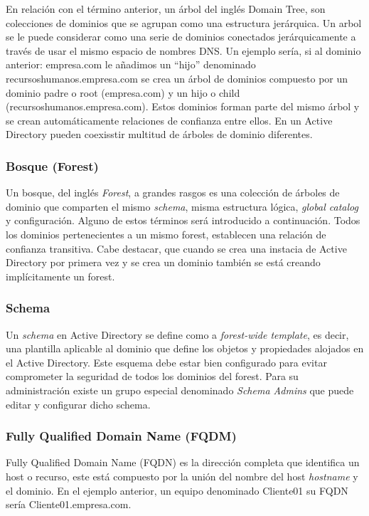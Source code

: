 En relación con el término anterior, un árbol del inglés {Domain Tree}, son colecciones de dominios que se agrupan como una estructura jerárquica. Un arbol se le puede considerar como una serie de dominios conectados jerárquicamente a través de usar el mismo espacio de nombres DNS. Un ejemplo sería, si al dominio anterior: empresa.com le añadimos un ``hijo'' denominado recursoshumanos.empresa.com se crea un árbol de dominios compuesto por un dominio padre o root (empresa.com) y un hijo o child (recursoshumanos.empresa.com). Estos dominios forman parte del mismo árbol y se crean automáticamente relaciones de confianza entre ellos. En un Active Directory pueden coexisstir multitud de árboles de dominio diferentes. 

\subsubsection{Bosque (Forest)}
Un bosque, del inglés {\it Forest}, a grandes rasgos es una colección de árboles de dominio que comparten el mismo {\it schema}, misma estructura lógica, {\it global catalog} y configuración. Alguno de estos términos será introducido a continuación. Todos los dominios pertenecientes a un mismo forest, establecen una relación de confianza transitiva. Cabe destacar, que cuando se crea una instacia de Active Directory por primera vez y se crea un dominio también se está creando implícitamente un forest. 

\subsubsection{Schema}

Un {\it schema} en Active Directory se define como a {\it forest-wide template}, es decir, una plantilla aplicable al dominio que define los objetos y propiedades alojados en el Active Directory. Este esquema debe estar bien configurado para evitar comprometer la seguridad de todos los dominios del forest. Para su administración existe un grupo especial denominado {\it Schema Admins} que puede editar y configurar dicho schema. 

\subsubsection{Fully Qualified Domain Name (FQDM)}

Fully Qualified Domain Name (FQDN) es la dirección completa que identifica un host o recurso, este está compuesto por la unión del nombre del host {\it hostname} y el dominio. En el ejemplo anterior, un equipo denominado Cliente01 su FQDN sería Cliente01.empresa.com. 

